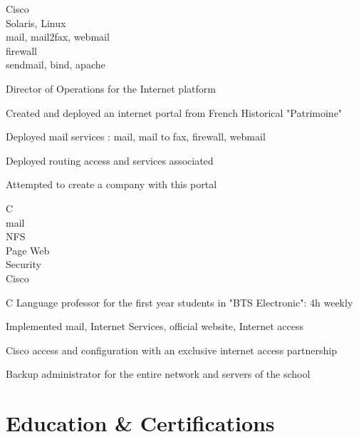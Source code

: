 \documentclass[a4paper,11pt]{cv4tw}%
\begin{document}
	{Cisco\\Solaris, Linux\\mail, mail2fax, webmail\\firewall\\sendmail, bind, apache}
		{
		\begin{missions}
			\item Director of Operations for the Internet platform
			\item Created and deployed an internet portal from French Historical "Patrimoine"
			\item Deployed mail services : mail, mail to fax, firewall, webmail
			\item Deployed routing access and services associated
			\item Attempted to create a company with this portal
		\end{missions}
	}

	{C\\mail\\NFS\\Page Web\\Security\\Cisco}
		{
		\begin{missions}
			\item C Language professor for the first year students in "BTS Electronic": 4h weekly
			\item Implemented mail, Internet Services, official website, Internet access
			\item Cisco access and configuration with an exclusive internet access partnership
			\item Backup administrator for the entire network and servers of the school
		\end{missions}
	}


	\section{Education \& Certifications}
\end{document}
